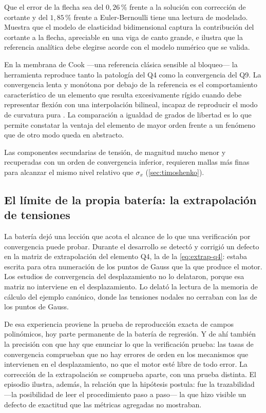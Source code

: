 Que el error de la flecha sea del $0{,}26\,\%$ frente a la solución con corrección de cortante y del $1{,}85\,\%$ frente a Euler-Bernoulli tiene una lectura de modelado. Muestra que el modelo de elasticidad bidimensional captura la contribución del cortante a la flecha, apreciable en una viga de canto grande, e ilustra que la referencia analítica debe elegirse acorde con el modelo numérico que se valida.

En la membrana de Cook —una referencia clásica sensible al bloqueo— la herramienta reproduce tanto la patología del Q4 como la convergencia del Q9. La convergencia lenta y monótona por debajo de la referencia es el comportamiento característico de un elemento que resulta excesivamente rígido cuando debe representar flexión con una interpolación bilineal, incapaz de reproducir el modo de curvatura pura \autocites[pp.~98-99]{cook2002concepts}[p.~476]{bathe2014fem}. La comparación a igualdad de grados de libertad es lo que permite constatar la ventaja del elemento de mayor orden frente a un fenómeno que de otro modo queda en abstracto.

Las componentes secundarias de tensión, de magnitud mucho menor y recuperadas con un orden de convergencia inferior, requieren mallas más finas para alcanzar el mismo nivel relativo que $\sigma_x$ (\autoref{sec:timoshenko}).

\subsection{El límite de la propia batería: la extrapolación de tensiones}
\label{sec:leccion-extrapolacion}

La batería dejó una lección que acota el alcance de lo que una verificación por convergencia puede probar. Durante el desarrollo se detectó y corrigió un defecto en la matriz de extrapolación del elemento Q4, la de la \autoref{eq:extrap-q4}: estaba escrita para otra numeración de los puntos de Gauss que la que produce el motor. Los estudios de convergencia del desplazamiento no lo delataron, porque esa matriz no interviene en el desplazamiento. Lo delató la lectura de la memoria de cálculo del ejemplo canónico, donde las tensiones nodales no cerraban con las de los puntos de Gauss.

De esa experiencia proviene la prueba de reproducción exacta de campos polinómicos, hoy parte permanente de la batería de regresión. Y de ahí también la precisión con que hay que enunciar lo que la verificación prueba: las tasas de convergencia comprueban que no hay errores de orden en los mecanismos que intervienen en el desplazamiento, no que el motor esté libre de todo error. La corrección de la extrapolación se comprueba aparte, con una prueba distinta. El episodio ilustra, además, la relación que la hipótesis postula: fue la trazabilidad —la posibilidad de leer el procedimiento paso a paso— la que hizo visible un defecto de exactitud que las métricas agregadas no mostraban.

